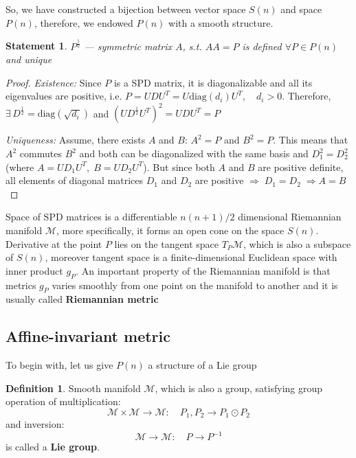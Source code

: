 \documentclass[12pt]{extarticle}
\newtheorem{statement}{Statement}[section]
\theoremstyle{definition}
\newtheorem{definition}{Definition}[section]
\theoremstyle{remark}
\begin{document}
	
	So, we have constructed a bijection between vector space $S(n)$ and space $P(n)$, therefore, we endowed $P(n)$ with a smooth structure. 
	
	
	\begin{statement}
		$P^{\frac12}$ --- symmetric matrix $A$, s.t. $AA = P$ is defined $\forall P \in P(n)$ and unique     
	\end{statement}
	
	\begin{proof}
		\textit{Existence:} Since $P$ is a SPD matrix, it is diagonalizable and all its eigenvalues are positive, i.e. $P = UDU^T = U \text{diag}(d_i)U^T, \quad d_i > 0$. Therefore, $\exists \, D^{\frac12} = \text{diag}(\sqrt{d_i})$ and $ (UD^{\frac12}U^T )^2 = UDU^T = P$
		
		\textit{Uniqueness: }Assume, there exists $A$ and $B$: $A^2 = P$ and $B^2 = P$. This means that $A^2$ commutes $B^2$ and both can be diagonalized with the same basis and $D_1^2 = D_2^2$ (where $A = UD_1 U^T, \; B = UD_2U^T$). But since both $A$ and $B$ are positive definite, all elements of diagonal matrices $D_1$ and $D_2$ are positive $\Rightarrow \;D_1 = D_2 \; \Rightarrow A = B$
	\end{proof}
	
	
	
	Space of SPD matrices is a differentiable $n(n+1)/2$ dimensional Riemannian manifold $\mathcal{M}$, more specifically, it forms an open cone on the space $S(n)$. Derivative at the point $P$ lies on the tangent space $T_P\mathcal{M}$, which is also a subspace of $S(n)$, moreover tangent space is a finite-dimensional Euclidean space with inner product $g_P$.  An important property of the Riemannian manifold is that metrics $g_P$ varies smoothly from one point on the manifold to another and it is usually called \textbf{Riemannian metric}
	
	\subsection{Affine-invariant metric}
	
	To begin with, let us give $P(n)$ a structure of a Lie group
	\begin{definition}
		Smooth manifold $\mathcal{M}$, which is also a group, satisfying group operation of multiplication:
		\begin{equation*}
		\mathcal{M} \times \mathcal{M} \rightarrow \mathcal{M}:\quad P_1, P_2 \rightarrow P_1 \odot P_2 
		\end{equation*}
		and inversion:
		\begin{equation*}
		\mathcal{M}  \rightarrow \mathcal{M}: \quad P \rightarrow P^{-1}
		\end{equation*}
		is called a \textbf{Lie group}.
	\end{definition}
	
\end{document}
